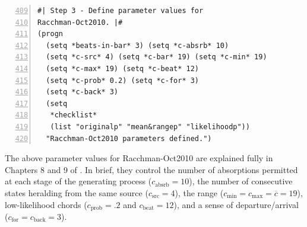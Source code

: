 \begin{Verbatim}[frame=single,numbers=left,firstnumber=409]
#| Step 3 - Define parameter values for
Racchman-Oct2010. |#
(progn
  (setq *beats-in-bar* 3) (setq *c-absrb* 10)
  (setq *c-src* 4) (setq *c-bar* 19) (setq *c-min* 19)
  (setq *c-max* 19) (setq *c-beat* 12)
  (setq *c-prob* 0.2) (setq *c-for* 3)
  (setq *c-back* 3)
  (setq
   *checklist*
   (list "originalp" "mean&rangep" "likelihoodp"))
  "Racchman-Oct2010 parameters defined.")
\end{Verbatim}
The above parameter values for Racchman-Oct2010 are explained fully in Chapters 8 and 9 of \citet{collins2011b}. In brief, they control the number of absorptions permitted at each stage of the generating process ($c_\text{absrb} = 10$), the number of consecutive states heralding from the same source ($c_\text{src} = 4$), the range ($c_{\min} = c_{\max} = \overline{c} = 19$), low-likelihood chords ($c_\text{prob} = .2$ and $c_\text{beat} = 12$), and a sense of departure/arrival ($c_\text{for} = c_\text{back} = 3$).

